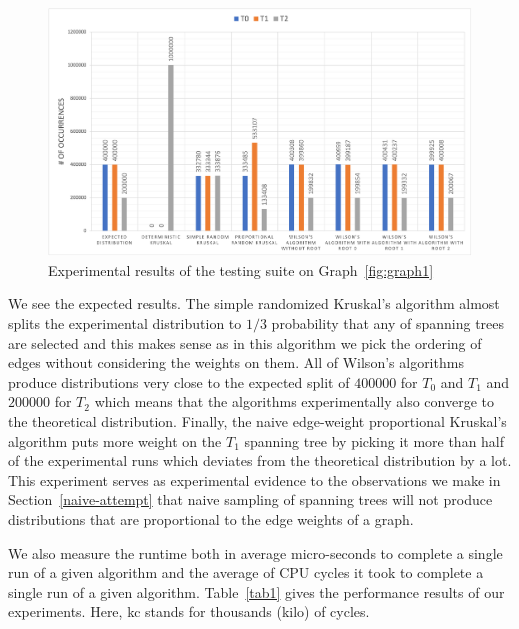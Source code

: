 \documentclass[11pt]{article}
\begin{document}
\begin{figure}[ht]
\includegraphics[scale=0.60]{figs/fig1.png}
\caption{Experimental results of the testing suite on Graph~\ref{fig:graph1}}
\centering
\label{fig1}
\end{figure}

We see the expected results. The simple randomized Kruskal's algorithm almost splits the experimental distribution to $1/3$ probability that any of spanning trees are selected and this makes sense as in this algorithm we pick the ordering of edges without considering the weights on them. All of Wilson's algorithms produce distributions very close to the expected split of $400000$ for $T_0$ and $T_1$ and $200000$ for $T_2$ which means that the algorithms experimentally also converge to the theoretical distribution. Finally, the naive edge-weight proportional Kruskal's algorithm puts more weight on the $T_1$ spanning tree by picking it more than half of the experimental runs which deviates from the theoretical distribution by a lot. This experiment serves as experimental evidence to the observations we make in Section~\ref{naive-attempt} that naive sampling of spanning trees will not produce distributions that are proportional to the edge weights of a graph.

We also measure the runtime both in average micro-seconds to complete a single run of a given algorithm and the average of CPU cycles it took to complete a single run of a given algorithm. Table~\ref{tab1} gives the performance results of our experiments. Here, kc stands for thousands (kilo) of cycles.
\end{document}
